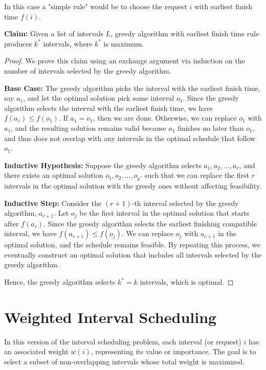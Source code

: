 \documentclass[12pt]{article}
\begin{document}
\noindent 
In this case a "simple rule" would be to choose the request \(i\) with earliest finish 
time \(f(i)\). 

\noindent 
\textbf{Claim:} Given a list of intervals \(L\), greedy algorithm with 
earliest finish time rule produces \(k^*\) intervals, where 
\(k^*\) is maximum.

\begin{proof}
    We prove this claim using an exchange argument via induction on the number of intervals selected by the greedy algorithm.

    \noindent
    \textbf{Base Case:} The greedy algorithm picks the interval with the earliest finish time, say \(a_1\), and let the optimal solution pick some interval \(o_1\). Since the greedy algorithm selects the interval with the earliest finish time, we have \(f(a_1) \leq f(o_1)\). If \(a_1 = o_1\), then we are done. Otherwise, we can replace \(o_1\) with \(a_1\), and the resulting solution remains valid because \(a_1\) finishes no later than \(o_1\), and thus does not overlap with any intervals in the optimal schedule that follow \(o_1\).

    \noindent
    \textbf{Inductive Hypothesis:} Suppose the greedy algorithm selects \(a_1, a_2, \dots, a_r\), and there exists an optimal solution \(o_1, o_2, \dots, o_{k^*}\) such that we can replace the first \(r\) intervals in the optimal solution with the greedy ones without affecting feasibility.

    \noindent
    \textbf{Inductive Step:} Consider the \((r+1)\)-th interval selected by the greedy algorithm, \(a_{r+1}\). Let \(o_j\) be the first interval in the optimal solution that starts after \(f(a_r)\). Since the greedy algorithm selects the earliest finishing compatible interval, we have \(f(a_{r+1}) \leq f(o_j)\). We can replace \(o_j\) with \(a_{r+1}\) in the optimal solution, and the schedule remains feasible. By repeating this process, we eventually construct an optimal solution that includes all intervals selected by the greedy algorithm.

    \noindent
    Hence, the greedy algorithm selects \(k^* = k\) intervals, which is optimal.
\end{proof}


\section*{Weighted Interval Scheduling}

In this version of the interval scheduling problem, each interval (or request) \(i\) has an associated weight \(w(i)\), representing its value or importance. The goal is to select a subset of non-overlapping intervals whose total weight is maximized.
\end{document}
